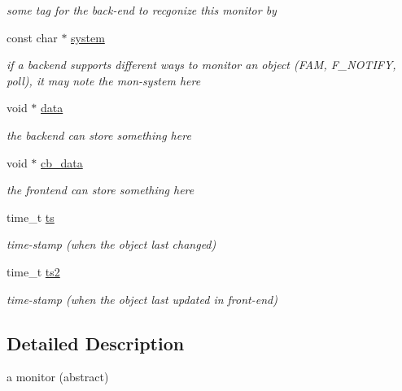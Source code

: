 \begin{CompactItemize}
\begin{CompactList}\small\item\em some tag for the back-end to recgonize this monitor by \item\end{CompactList}\item 
\hypertarget{struct__noir__monitor_o5}{
const char $\ast$ \hyperlink{struct__noir__monitor_o5}{system}}
\label{struct__noir__monitor_o5}

\begin{CompactList}\small\item\em if a backend supports different ways to monitor an object (FAM, F\_\-NOTIFY, poll), it may note the mon-system here \item\end{CompactList}\item 
\hypertarget{struct__noir__monitor_o6}{
void $\ast$ \hyperlink{struct__noir__monitor_o6}{data}}
\label{struct__noir__monitor_o6}

\begin{CompactList}\small\item\em the backend can store something here \item\end{CompactList}\item 
\hypertarget{struct__noir__monitor_o7}{
void $\ast$ \hyperlink{struct__noir__monitor_o7}{cb\_\-data}}
\label{struct__noir__monitor_o7}

\begin{CompactList}\small\item\em the frontend can store something here \item\end{CompactList}\item 
\hypertarget{struct__noir__monitor_o8}{
time\_\-t \hyperlink{struct__noir__monitor_o8}{ts}}
\label{struct__noir__monitor_o8}

\begin{CompactList}\small\item\em time-stamp (when the object last changed) \item\end{CompactList}\item 
\hypertarget{struct__noir__monitor_o9}{
time\_\-t \hyperlink{struct__noir__monitor_o9}{ts2}}
\label{struct__noir__monitor_o9}

\begin{CompactList}\small\item\em time-stamp (when the object last updated in front-end) \item\end{CompactList}\end{CompactItemize}


\subsection{Detailed Description}
a monitor (abstract) 

